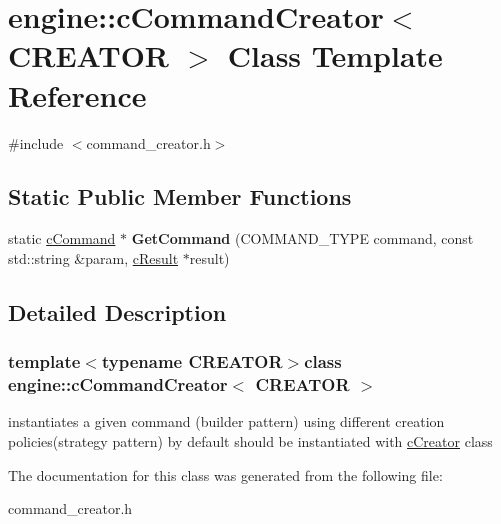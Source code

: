 \hypertarget{classengine_1_1cCommandCreator}{\section{engine\-:\-:c\-Command\-Creator$<$ \-C\-R\-E\-A\-T\-O\-R $>$ \-Class \-Template \-Reference}
\label{classengine_1_1cCommandCreator}
}


{\ttfamily \#include $<$command\-\_\-creator.\-h$>$}

\subsection*{\-Static \-Public \-Member \-Functions}
\begin{DoxyCompactItemize}
\item 
\hypertarget{classengine_1_1cCommandCreator_a37ff251d6e86ded9b9893cf66a635cd2}{static \hyperlink{classengine_1_1cCommand}{c\-Command} $\ast$ {\bfseries \-Get\-Command} (\-C\-O\-M\-M\-A\-N\-D\-\_\-\-T\-Y\-P\-E command, const std\-::string \&param, \hyperlink{classengine_1_1cResult}{c\-Result} $\ast$result)}\label{classengine_1_1cCommandCreator_a37ff251d6e86ded9b9893cf66a635cd2}

\end{DoxyCompactItemize}


\subsection{\-Detailed \-Description}
\subsubsection*{template$<$typename C\-R\-E\-A\-T\-O\-R$>$class engine\-::c\-Command\-Creator$<$ C\-R\-E\-A\-T\-O\-R $>$}

instantiates a given command (builder pattern) using different creation policies(strategy pattern) by default should be instantiated with \hyperlink{classengine_1_1cCreator}{c\-Creator} class 

\-The documentation for this class was generated from the following file\-:\begin{DoxyCompactItemize}
\item 
command\-\_\-creator.\-h\end{DoxyCompactItemize}
